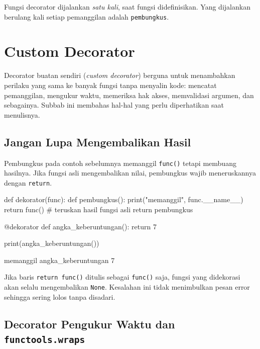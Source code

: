 \begin{info}
Fungsi decorator dijalankan \emph{satu kali}, saat fungsi didefinisikan. Yang dijalankan berulang kali setiap pemanggilan adalah \texttt{pembungkus}.
\end{info}

\section{Custom Decorator}

Decorator buatan sendiri (\emph{custom decorator}) berguna untuk menambahkan perilaku yang sama ke banyak fungsi tanpa menyalin kode: mencatat pemanggilan, mengukur waktu, memeriksa hak akses, memvalidasi argumen, dan sebagainya. Subbab ini membahas hal-hal yang perlu diperhatikan saat menulisnya.

\subsection{Jangan Lupa Mengembalikan Hasil}

Pembungkus pada contoh sebelumnya memanggil \texttt{func()} tetapi membuang hasilnya. Jika fungsi asli mengembalikan nilai, pembungkus wajib meneruskannya dengan \texttt{return}.

\begin{kode}
def dekorator(func):
    def pembungkus():
        print("memanggil", func.__name__)
        return func()               # teruskan hasil fungsi asli
    return pembungkus

@dekorator
def angka_keberuntungan():
    return 7

print(angka_keberuntungan())
\end{kode}

\begin{keluaran}
memanggil angka_keberuntungan
7
\end{keluaran}

\begin{penting}
Jika baris \texttt{return func()} ditulis sebagai \texttt{func()} saja, fungsi yang didekorasi akan selalu mengembalikan \texttt{None}. Kesalahan ini tidak menimbulkan pesan error sehingga sering lolos tanpa disadari.
\end{penting}

\subsection{Decorator Pengukur Waktu dan \texttt{functools.wraps}}

